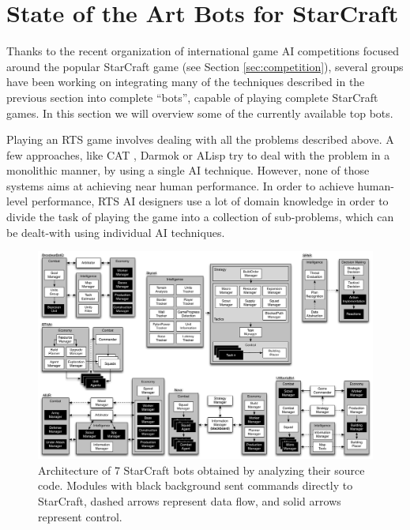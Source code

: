 \documentclass[journal]{IEEEtran}
\begin{document}
\section{State of the Art Bots for StarCraft}\label{sec:bot}

Thanks to the recent organization of international game AI competitions focused around the popular StarCraft game (see Section \ref{sec:competition}), several groups have been working on integrating many of the techniques described in the previous section into complete ``bots'', capable of playing complete StarCraft games. In this section we will overview some of the currently available top bots.


Playing an RTS game involves dealing with all the problems described above. A few approaches, like CAT \cite{LTW}, Darmok \cite{OntanonMSR10} or ALisp \cite{Marthi05} try to deal with the problem in a monolithic manner, by using a single AI technique. However, none of those systems aims at achieving near human performance. In order to achieve human-level performance, RTS AI designers use a lot of domain knowledge in order to divide the task of playing the game into a collection of sub-problems, which can be dealt-with using individual AI techniques.

\begin{figure}[ta]
    \centering
    \includegraphics[width=\textwidth]{figures/figure-bot-architectures-wide.pdf}
    \caption{Architecture of 7 StarCraft bots obtained by analyzing their source code. Modules with black background sent commands directly to StarCraft, dashed arrows represent data flow, and solid arrows represent control.}
    \label{fig:bot-architecture}
\end{figure}
\end{document}
